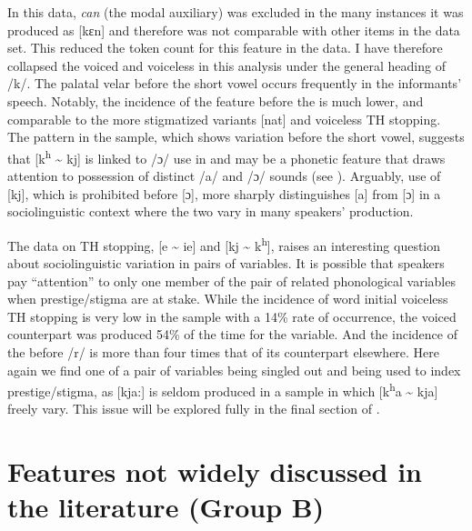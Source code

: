   In this data, \textit{can} (the modal auxiliary) was excluded in the many instances it was produced as [kɛn] and therefore was not comparable with other items in the data set.  This reduced the token count for this feature in the data.  I have therefore collapsed the voiced and voiceless  in this analysis under the general heading of /k/.  The palatal velar before the short vowel occurs frequently in the informants’ speech.  Notably, the incidence of the feature before the  is much lower, and comparable to the more stigmatized variants [nat] and voiceless TH stopping.  The pattern in the sample, which shows variation before the short vowel, suggests that [k\textsuperscript{h} {\textasciitilde} kj] is linked to /ɔ/ use in  and may be a phonetic feature that draws attention to possession of distinct /a/ and /ɔ/ sounds (see \citealt[xlix]{Cassidy1967}).  Arguably, use of [kj], which is prohibited before [ɔ], more sharply distinguishes [a] from [ɔ] in a sociolinguistic context where the two vary in many speakers’ production.             

The data on TH stopping, [e {\textasciitilde} ie] and [kj {\textasciitilde} k\textsuperscript{h}], raises an interesting question about sociolinguistic variation in pairs of variables.  It is possible that speakers pay “attention” to only one member of the pair of related phonological variables when prestige\slash stigma are at stake.  While the incidence of word initial voiceless TH stopping is very low in the sample with a 14\% rate of occurrence, the voiced counterpart was produced 54\% of the time for the variable.  And the incidence of the  before /r/ is more than four times that of its counterpart elsewhere.  Here again we find one of a pair of variables being singled out and being used to index prestige/stigma, as [kja:] is seldom produced in a sample in which [k\textsuperscript{h}a {\textasciitilde} kja] freely vary.  This issue will be explored fully in the final section of .

\section{Features not widely discussed in the literature (Group B)}\label{sec:2.4}      

